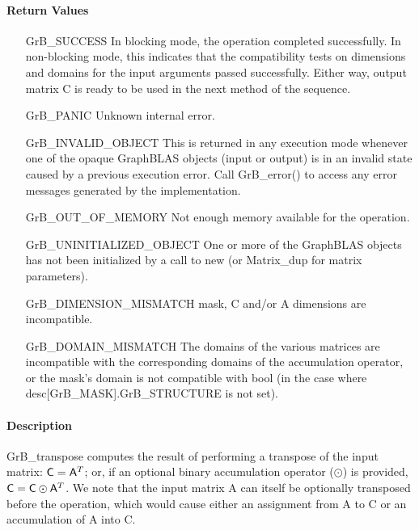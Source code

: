 \paragraph{Return Values}

\begin{itemize}[leftmargin=2.1in]
    \item[{\sf GrB\_SUCCESS}]         In blocking mode, the operation completed
    successfully. In non-blocking mode, this indicates that the compatibility 
    tests on dimensions and domains for the input arguments passed successfully. 
    Either way, output matrix {\sf C} is ready to be used in the next method of
    the sequence.

    \item[{\sf GrB\_PANIC}]           Unknown internal error.

    \item[{\sf GrB\_INVALID\_OBJECT}] This is returned in any execution mode 
    whenever one of the opaque GraphBLAS objects (input or output) is in an invalid 
    state caused by a previous execution error.  Call {\sf GrB\_error()} to access 
    any error messages generated by the implementation.

    \item[{\sf GrB\_OUT\_OF\_MEMORY}] Not enough memory available for the operation.

    \item[{\sf GrB\_UNINITIALIZED\_OBJECT}] One or more of the GraphBLAS objects 
    has not been initialized by a call to {\sf new} (or {\sf Matrix\_dup} for matrix
    parameters).

    \item[{\sf GrB\_DIMENSION\_MISMATCH}]  {\sf mask}, {\sf C} and/or {\sf A} 
    dimensions are incompatible.

    \item[{\sf GrB\_DOMAIN\_MISMATCH}]    The domains of the various matrices are
    incompatible with the corresponding domains of the 
    accumulation operator, or the mask's domain is not compatible with {\sf bool}
    (in the case where {\sf desc[GrB\_MASK].GrB\_STRUCTURE} is not set).
\end{itemize}

\paragraph{Description}

{\sf GrB\_transpose} computes the result of performing a transpose of the input matrix:
${\sf C} = {\sf A}^T$; or, if an optional binary accumulation 
operator ($\odot$) is provided, ${\sf C} = {\sf C} \odot {\sf A}^T$.  
We note that the input matrix {\sf A} can itself be optionally transposed before the operation,
which would cause either an assignment from {\sf A} to {\sf C} or an
accumulation of {\sf A} into {\sf C}.

